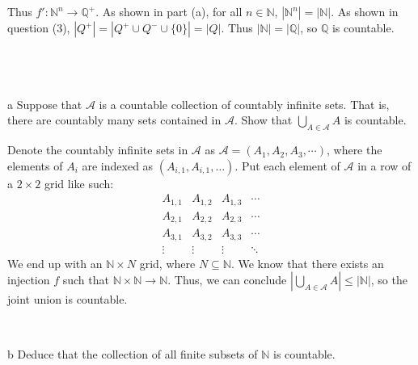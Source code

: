 \documentclass{article}
\begin{document}
Thus $f':\mathbb{N}^{n}\rightarrow \mathbb{Q}^+$. As shown in part (a), for all $n\in \mathbb{N}$, $|\mathbb{N}^{n} |=|\mathbb{N} |$. As shown in question (3), $|Q^{+} |=|Q^{+} \cup Q^{-} \cup \{0\} |=|Q|$. Thus $|\mathbb{N} |=|\mathbb{Q} |$, so $\mathbb{Q}$ is countable.


\
\hline
\section{}

\begin{problem} a
Suppose that $\mathcal{A}$ is a countable collection of countably infinite sets. That is, there are countably many sets contained in $\mathcal{A}$. Show that $\bigcup_{A\in\mathcal{A}} A$ is countable.
\end{problem}

Denote the countably infinite sets in $\mathcal{A}$ as $\mathcal{A} =( A_{1} ,A_{2} ,A_{3} ,\cdots )$, where the elements of $A_{i}$ are indexed as $( A_{i,1} ,A_{i,1} ,\dotsc )$. Put each element of $\mathcal{A}$ in a row of a $2\times 2$ grid like such:
\begin{equation*}
\begin{matrix}
A_{1,1} & A_{1,2} & A_{1,3} & \cdots \\
A_{2,1} & A_{2,2} & A_{2,3} & \cdots \\
A_{3,1} & A_{3,2} & A_{3,3} & \cdots \\
\vdots  & \vdots  & \vdots  & \ddots 
\end{matrix}
\end{equation*}
We end up with an $\mathbb{N} \times N$ grid, where $N\subseteq \mathbb{N}$. We know that there exists an injection $f$ such that $\mathbb{N} \times \mathbb{N}\rightarrow \mathbb{N}$. Thus, we can conclude $\left| \bigcup\nolimits _{A\in \mathcal{A}} A\right| \leq |\mathbb{N} |$, so the joint union is countable.

\

\begin{problem} b
Deduce that the collection of all finite subsets of $\mathbb{N}$ is countable. 
\end{problem}
\end{document}

